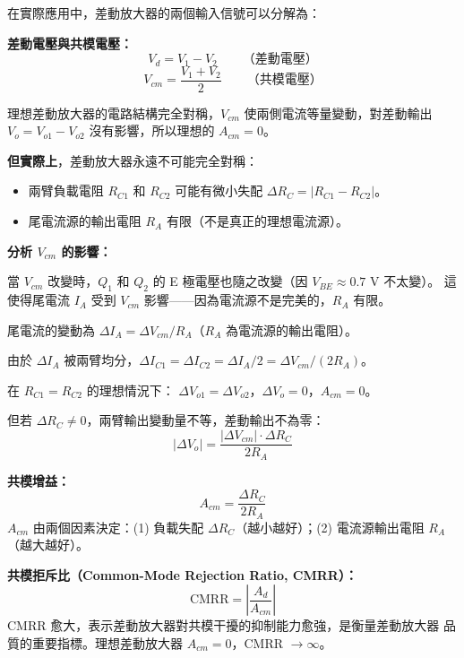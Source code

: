 \documentclass[12pt]{article}
\begin{document}
\begin{keybox}[共模信號的定義與影響]
在實際應用中，差動放大器的兩個輸入信號可以分解為：
\begin{formulabox}
\textbf{差動電壓與共模電壓：}
\[
  V_d = V_1 - V_2 \qquad\text{（差動電壓）}
\]
\[
  V_{cm} = \frac{V_1 + V_2}{2} \qquad\text{（共模電壓）}
\]
\end{formulabox}

理想差動放大器的電路結構完全對稱，$V_{cm}$ 使兩側電流等量變動，對差動輸出
$V_o = V_{o1} - V_{o2}$ 沒有影響，所以理想的 $A_{cm} = 0$。

\textbf{但實際上}，差動放大器永遠不可能完全對稱：
\begin{itemize}[leftmargin=2em,itemsep=1pt]
  \item 兩臂負載電阻 $R_{C1}$ 和 $R_{C2}$ 可能有微小失配 $\Delta R_C = |R_{C1} - R_{C2}|$。
  \item 尾電流源的輸出電阻 $R_A$ 有限（不是真正的理想電流源）。
\end{itemize}
\end{keybox}

\noindent\textbf{分析 $V_{cm}$ 的影響：}

當 $V_{cm}$ 改變時，$Q_1$ 和 $Q_2$ 的 E 極電壓也隨之改變（因 $V_{BE} \approx 0.7$ V 不太變）。
這使得尾電流 $I_A$ 受到 $V_{cm}$ 影響——因為電流源不是完美的，$R_A$ 有限。

尾電流的變動為 $\Delta I_A = \Delta V_{cm} / R_A$（$R_A$ 為電流源的輸出電阻）。

由於 $\Delta I_A$ 被兩臂均分，$\Delta I_{C1} = \Delta I_{C2} = \Delta I_A / 2 = \Delta V_{cm} / (2R_A)$。

在 $R_{C1} = R_{C2}$ 的理想情況下：
$\Delta V_{o1} = \Delta V_{o2}$，$\Delta V_o = 0$，$A_{cm} = 0$。

但若 $\Delta R_C \neq 0$，兩臂輸出變動量不等，差動輸出不為零：
\[
  |\Delta V_o| = \frac{|\Delta V_{cm}|\cdot\Delta R_C}{2R_A}
\]

\begin{formulabox}
\textbf{共模增益：}
\[
  A_{cm} = \frac{\Delta R_C}{2R_A} \tag{12.21}
\]
$A_{cm}$ 由兩個因素決定：(1) 負載失配 $\Delta R_C$（越小越好）；(2) 電流源輸出電阻
$R_A$（越大越好）。
\end{formulabox}

\begin{formulabox}
\textbf{共模拒斥比（Common-Mode Rejection Ratio, CMRR）：}
\[
  \text{CMRR} = \left|\frac{A_d}{A_{cm}}\right| \tag{12.22}
\]
CMRR 愈大，表示差動放大器對共模干擾的抑制能力愈強，是衡量差動放大器
品質的重要指標。理想差動放大器 $A_{cm} = 0$，CMRR $\to \infty$。
\end{formulabox}
\end{document}
